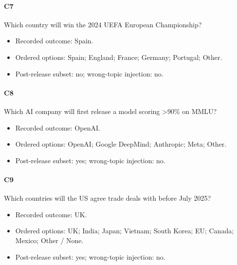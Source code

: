 \paragraph*{C7} Which country will win the 2024 UEFA European Championship?

\begin{itemize}

\item Recorded outcome: Spain.

\item Ordered options: Spain; England; France; Germany; Portugal; Other.

\item Post-release subset: no; wrong-topic injection: no.

\end{itemize}

\paragraph*{C8} Which AI company will first release a model scoring >90\% on MMLU?

\begin{itemize}

\item Recorded outcome: OpenAI.

\item Ordered options: OpenAI; Google DeepMind; Anthropic; Meta; Other.

\item Post-release subset: yes; wrong-topic injection: no.

\end{itemize}

\paragraph*{C9} Which countries will the US agree trade deals with before July 2025?

\begin{itemize}

\item Recorded outcome: UK.

\item Ordered options: UK; India; Japan; Vietnam; South Korea; EU; Canada; Mexico; Other / None.

\item Post-release subset: yes; wrong-topic injection: no.

\end{itemize}

